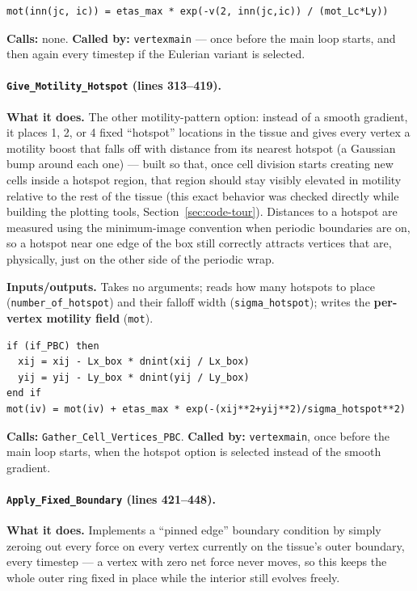 \documentclass[11pt]{article}
\begin{document}
\begin{lstlisting}[caption={The exponential motility gradient in \texttt{Give\_Motility\_Gradient}.}]
mot(inn(jc, ic)) = etas_max * exp(-v(2, inn(jc,ic)) / (mot_Lc*Ly))
\end{lstlisting}

\textbf{Calls:} none. \textbf{Called by:} \texttt{vertexmain} --- once before the main
loop starts, and then again every timestep if the Eulerian variant is selected.

\paragraph{\texttt{Give\_Motility\_Hotspot} (lines 313--419).}
\textbf{What it does.} The other motility-pattern option: instead of a smooth
gradient, it places 1, 2, or 4 fixed ``hotspot'' locations in the tissue and gives every
vertex a motility boost that falls off with distance from its nearest hotspot (a
Gaussian bump around each one) --- built so that, once cell division starts creating
new cells inside a hotspot region, that region should stay visibly elevated in motility
relative to the rest of the tissue (this exact behavior was checked directly while
building the plotting tools, Section~\ref{sec:code-tour}). Distances to a hotspot are
measured using the minimum-image convention when periodic boundaries are on, so a
hotspot near one edge of the box still correctly attracts vertices that are, physically,
just on the other side of the periodic wrap.

\textbf{Inputs/outputs.} Takes no arguments; reads how many hotspots to place
(\texttt{number\_of\_hotspot}) and their falloff width (\texttt{sigma\_hotspot}); writes
the \textbf{per-vertex motility field} (\texttt{mot}).

\begin{lstlisting}[caption={The Gaussian falloff around each hotspot in \texttt{Give\_Motility\_Hotspot}, with minimum-image distances under periodic boundaries.}]
if (if_PBC) then
  xij = xij - Lx_box * dnint(xij / Lx_box)
  yij = yij - Ly_box * dnint(yij / Ly_box)
end if
mot(iv) = mot(iv) + etas_max * exp(-(xij**2+yij**2)/sigma_hotspot**2)
\end{lstlisting}

\textbf{Calls:} \texttt{Gather\_Cell\_Vertices\_PBC}. \textbf{Called by:}
\texttt{vertexmain}, once before the main loop starts, when the hotspot option is
selected instead of the smooth gradient.

\paragraph{\texttt{Apply\_Fixed\_Boundary} (lines 421--448).}
\textbf{What it does.} Implements a ``pinned edge'' boundary condition by simply
zeroing out every force on every vertex currently on the tissue's outer boundary,
every timestep --- a vertex with zero net force never moves, so this keeps the whole
outer ring fixed in place while the interior still evolves freely.
\end{document}
